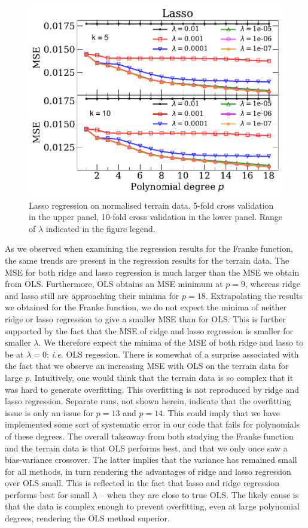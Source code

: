 \documentclass[a4paper, 
amsfonts, 
amssymb, 
amsmath, 
reprint, 
showkeys, 
nofootinbib, 
twoside]{revtex4-2}
\begin{document}
\begin{figure}
    \centering
    \includegraphics[width = \columnwidth]{Figures/terrain_scaled_lasso.pdf}
    \caption{Lasso regression on normalised terrain data. 5-fold cross validation in the upper panel, 10-fold cross validation in the lower panel. Range of $\lambda$ indicated in the figure legend.  }
    \label{fig:lasso_terrain}
\end{figure}

As we observed when examining the regression results for the Franke function, the same trends are present in the regression results for the terrain data. The MSE for both ridge and lasso regression is much larger than the MSE we obtain from OLS. Furthermore, OLS obtains an MSE minimum at $p = 9$, whereas ridge and lasso still are approaching their minima for $p = 18$. Extrapolating the results we obtained for the Franke function, we do not expect the minima of neither ridge or lasso regression to give a smaller MSE than for OLS. This is further supported by the fact that the MSE of ridge and lasso regression is smaller for smaller $\lambda$. We therefore expect the minima of the MSE of both ridge and lasso to be at $\lambda = 0$; \textit{i.e.} OLS regession. 
There is somewhat of a surprise associated with the fact that we observe an increasing MSE with OLS on the terrain data for large $p$. Intuitively, one would think that the terrain data is so complex that it was hard to generate overfitting. This overfitting is not reproduced by ridge and lasso regression. Separate runs, not shown herein, indicate that the overfitting issue is only an issue for $p = 13$ and $p = 14$. This could imply that we have implemented some sort of systematic error in our code that fails for polynomials of these degrees. 
The overall takeaway from both studying the Franke function and the terrain data is that OLS performs best, and that we only once saw a bias-variance crossover. The latter implies that the variance has remained small for all methods, in turn rendering the advantages of ridge and lasso regression over OLS small. This is reflected in the fact that lasso and ridge regression performs best for small $\lambda$ -- when they are close to true OLS. The likely cause is that the data is complex enough to prevent overfitting, even at large polynomial degrees, rendering the OLS method superior.
\end{document}

